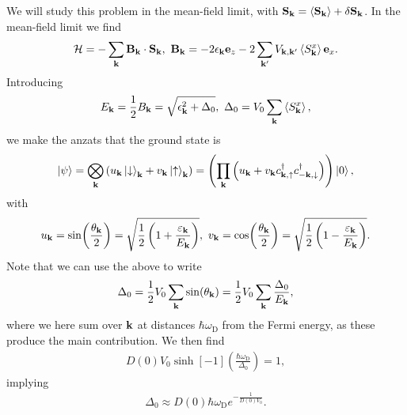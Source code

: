We will study this problem in the mean-field limit, with $\vb{S}_{\vb{k}} = \expval{\vb{S}_{\vb{k}}} + \delta\vb{S}_{\vb{k}}$. In the mean-field limit we find
\begin{align*}
	\ham = -\sum\limits_{\vb{k}}\vb{B}_{\vb{k}}\cdot\vb{S}_{\vb{k}},\ \vb{B}_{\vb{k}} = -2\epsilon_{\vb{k}}\vb{e}_{z} - 2\sum\limits_{\vb{k}\p}V_{\vb{k}, \vb{k}\p}\expval{S_{\vb{k}}^{x}}\vb{e}_{x}.
\end{align*}
Introducing
\begin{align*}
	E_{\vb{k}} = \frac{1}{2}B_{\vb{k}} = \sqrt{\epsilon_{\vb{k}}^{2} + \Delta_{0}},\ \Delta_{0} = V_{0}\sum\limits_{\vb{k}}\expval{S_{\vb{k}}^{x}},
\end{align*}
we make the anzats that the ground state is
\begin{align*}
	\ket{\psi} = \bigotimes\limits_{\vb{k}}\left(u_{\vb{k}}\ket{\downarrow}_{\vb{k}} + v_{\vb{k}}\ket{\uparrow}_{\vb{k}}\right) = \left(\prod\limits_{\vb{k}}\left(u_{\vb{k}} + v_{\vb{k}}c_{\vb{k}, \uparrow}^{\dagger} c_{-\vb{k}, \downarrow}^{\dagger}\right)\right)\ket{0},
\end{align*}
with
\begin{align*}
	u_{\vb{k}} = \sin(\frac{\theta_{\vb{k}}}{2}) = \sqrt{\frac{1}{2}\left(1 + \frac{\varepsilon_{\vb{k}}}{E_{\vb{k}}}\right)},\ v_{\vb{k}} = \cos(\frac{\theta_{\vb{k}}}{2}) = \sqrt{\frac{1}{2}\left(1 - \frac{\varepsilon_{\vb{k}}}{E_{\vb{k}}}\right)}.
\end{align*}
Note that we can use the above to write
\begin{align*}
	\Delta_{0} = \frac{1}{2}V_{0}\sum\limits_{\vb{k}}\sin(\theta_{\vb{k}}) = \frac{1}{2}V_{0}\sum\limits_{\vb{k}}\frac{\Delta_{0}}{E_{\vb{k}}},
\end{align*}
where we here sum over $\vb{k}$ at distances $\hbar\omega_{\text{D}}$ from the Fermi energy, as these produce the main contribution. We then find
\begin{align*}
	D(0)V_{0}\sinh[-1](\frac{\hbar\omega_{\text{D}}}{\Delta_{0}}) = 1,
\end{align*}
implying
\begin{align*}
	\Delta_{0} \approx D(0)\hbar\omega_{\text{D}}e^{-\frac{1}{D(0)V_{0}}}.
\end{align*}

